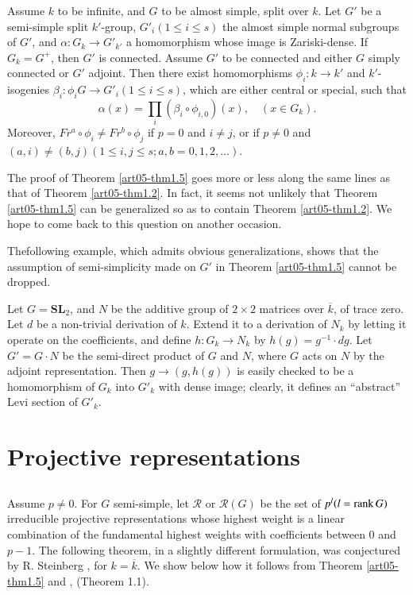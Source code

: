 \begin{theorem}\label{art05-thm1.5}
Assume $k$ to be infinite, and $G$ to be almost simple, split over $k$. Let $G'$ be a semi-simple split $k'$-group, $G'_{i}(1\leq i\leq s)$ the almost simple normal subgroups of $G'$, and $\alpha : G_{k}\to G'_{k'}$ a homomorphism whose image is Zariski-dense. If $G_{k}=G^{+}$, then $G'$ is connected. Assume $G'$ to be connected and either $G$ simply connected or $G'$ adjoint. Then there exist homomorphisms $\phi_{i}:k\to k'$ and $k'$-isogenies $\beta_{i}:\phi_{i}G\to G'_{i}(1\leq i\leq s)$, which are either central or special, such that
$$
\alpha(x)=\prod\limits_{i}(\beta_{i}\circ \phi_{i,0})(x),\quad (x\in G_{k}).
$$
Moreover, $Fr^{a}\circ \phi_{i}\neq Fr^{b}\circ \phi_{j}$ if $p=0$ and $i\neq j$, or if $p\neq 0$ and $(a,i)\neq (b,j)(1\leq i, j\leq s;a,b=0,1,2,\ldots)$.
\end{theorem}

The proof of Theorem \ref{art05-thm1.5} goes more or less along the same lines as that of Theorem \ref{art05-thm1.2}. In fact, it seems not unlikely that Theorem \ref{art05-thm1.5} can be generalized so as to contain Theorem \ref{art05-thm1.2}. We hope to come back to this question on another occasion.

\begin{example}\label{art05-exam1.6}
The\pageoriginale following example, which admits obvious generalizations, shows that the assumption of semi-simplicity made on $G'$ in Theorem \ref{art05-thm1.5} cannot be dropped.
\end{example}

Let $G=\mathbf{SL}_{2}$, and $N$ be the additive group of $2\times 2$ matrices over $\overline{k}$, of trace zero. Let $d$ be a non-trivial derivation of $k$. Extend it to a derivation of $N_{k}$ by letting it operate on the coefficients, and define $h:G_{k}\to N_{k}$ by $h(g)=g^{-1}\cdot dg$. Let $G'=G\cdot N$ be the semi-direct product of $G$ and $N$, where $G$ acts on $N$ by the adjoint representation. Then $g\to (g,h(g))$ is easily checked to be a homomorphism of $G_{k}$ into $G'_{k}$ with dense image; clearly, it defines an ``abstract'' Levi section of $G'_{k}$.

\section{Projective representations}\label{art05-sec2}

\subsection{}\label{art05-sec2.1}
Assume $p\neq 0$. For $G$ semi-simple, let $\mathscr{R}$ or $\mathscr{R}(G)$ be the set of $p^{l}(l=\operatorname{\mathrm{rank}} G)$ irreducible projective representations whose highest weight is a linear combination of the fundamental highest weights with coefficients between 0 and $p-1$. The following theorem, in a slightly different formulation, was conjectured by R. Steinberg \cite{art05-key9}, for $k=\overline{k}$. We show below how it follows from Theorem \ref{art05-thm1.5} and \cite{art05-key9}, (Theorem 1.1).


